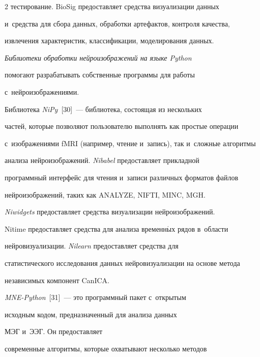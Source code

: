 \begin{multicols}{2}
тес\-тирование. BioSig предоставляет средства визуализации данных 


и~средства для сбора данных, обработки артефактов, контроля качества, 


извлечения характеристик, классификации, моделирования данных.


{ %





}


    


    \textit{Библиотеки обработки нейроизображений на языке Python} 


помогают разрабатывать собственные программы для работы 


с~нейроизображениями.


    


    Библиотека \textit{NiPy}~[30]~--- библиотека, состоящая из нескольких 


частей, которые позволяют пользователю выполнять как простые операции 


с~изоб\-ра\-же\-ни\-ями fMRI (например, чтение и~запись), так и~сложные алгоритмы 


анализа нейроизображений. \textit{Nibabel} предоставляет прикладной 


программный интерфейс для чтения и~записи различных форматов файлов 


нейроизображений, таких как \mbox{ANALYZE}, NIFTI, MINC, MGH. 


\textit{Niwidgets} пред\-остав\-ля\-ет средства визуализации нейроизображений. 


Nitime пред\-остав\-ля\-ет средства для анализа временн$\acute{\mbox{ы}}$х рядов в~области 


нейровизуализации. \textit{Nilearn} пред\-остав\-ля\-ет средства для 


статистического исследования данных нейровизуализации на основе метода 


независимых компонент CanICA.


    


    \textit{MNE-Python}~[31]~--- это программный пакет с~открытым 


исходным кодом, предназначенный для анализа данных 


МЭГ и~ЭЭГ. Он пред\-остав\-ля\-ет 


современные алгоритмы, которые охватывают несколько методов 



\end{multicols}
